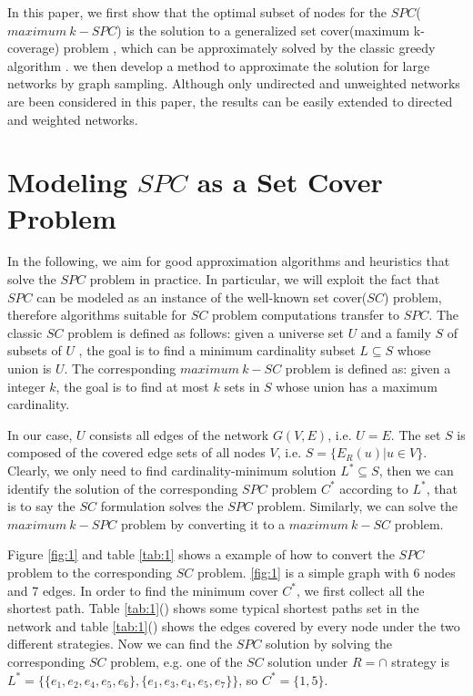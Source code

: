 \documentclass[review]{elsarticle}
\begin{document}
In this paper, we first show that the optimal subset of nodes for the $SPC$($maximum \  k-SPC$) is the solution to a generalized set cover(maximum k-coverage) problem \cite{karp1972reducibility}, which can be  approximately solved by the classic greedy algorithm \cite{chvatal1979greedy, vazirani2013approximation}. we then develop a method to approximate the solution for large networks by graph sampling. Although only undirected and unweighted networks are been considered in this paper, the results can be easily extended to directed and weighted networks.

\section{Modeling $SPC$ as a Set Cover Problem}

In the following, we aim for good approximation algorithms and heuristics that solve the $SPC$ problem in practice. In particular, we will exploit the fact that $SPC$ can be modeled as an instance of the well-known set cover($SC$) problem, therefore algorithms suitable for $SC$ problem computations transfer to $SPC$. The classic $SC$ problem is defined as follows: given a universe set $U$ and a family $S$ of subsets of $U$ , the goal is to find a minimum cardinality subset $L \subseteq S$ whose union is $U$. The corresponding $maximum \  k-SC$ problem is defined as: given a integer $k$, the goal is to find at most $k$ sets in $S$ whose union has a maximum cardinality.

In our case,  $U$ consists all edges of the network $G(V,E)$, i.e. $U=E$. The set $S$ is composed of the covered edge sets of all nodes $V$, i.e. $S=\{E_R(u)|u \in V\}$. Clearly, we only need to find cardinality-minimum solution $L^* \subseteq S$, then we can identify the solution of the corresponding $SPC$ problem $C^*$ according to $L^*$, that is to say the $SC$ formulation solves the $SPC$ problem. Similarly, we can solve the $maximum \  k-SPC$ problem by converting it to a $maximum \  k-SC$ problem.

Figure \ref{fig:1} and table \ref{tab:1} shows a example of how to convert the $SPC$ problem to the corresponding $SC$ problem. \ref{fig:1} is a simple graph with 6 nodes and 7 edges. In order to find the minimum cover $C^*$, we first collect all the shortest path. Table \ref{tab:1}() shows some typical shortest paths set in the network and table \ref{tab:1}() shows the edges covered by every node under the two different strategies. Now we can find the $SPC$ solution by solving the corresponding $SC$ problem, e.g. one of the $SC$ solution under $R=\cap$ strategy is $L^*=\{\{e_1,e_2,e_4,e_5,e_6\},\{e_1,e_3,e_4,e_5,e_7\} \}$, so $C^*=\{1,5\}$.
\end{document}
